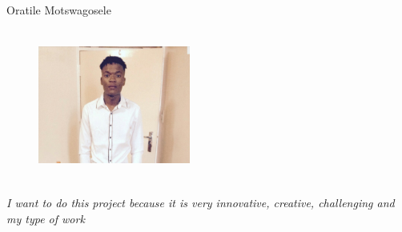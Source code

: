 \documentclass{article}
\begin{document}
\pagebreak
{\huge Oratile Motswagosele}
\begin{figure}[h]
\centering
\includegraphics[width=5cm, height=5cm]{Oratile.eps} 
\end{figure}

 	\textit{I want to do this project because it is very innovative, creative, challenging and my type of work}
\end{document}
